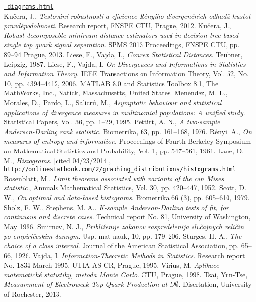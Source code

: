 \begin{thebibliography}{10}
\href{http://www-d0.fnal.gov/Run2Physics/top/top_public_web_pages/top_feynman_diagrams.html}{\texttt{\_diagrams.html}}\\
Ku\v cera, J., {\em Testov\' an\'i robustnosti a eficience R\' enyiho divergen\v cn\' ich odhad\r u hustot pravd\v epodobnosti}. Research report, FNSPE CTU, Prague, 2012.
Ku\v cera, J., {\em Robust \ren decomposable minimum distance estimators used in decision tree based single top quark  signal separation}. SPMS 2013 Proceedings, FNSPE CTU, pp. 89--94 Prague, 2013.
Liese, F., Vajda, I., {\em Convex Statistical Distances}. Teubner, Leipzig, 1987.
Liese, F., Vajda, I. {\em On Divergences and Informations in Statistics and Information Theory}. IEEE Transactions on Information Theory, Vol. 52, No. 10, pp. 4394--4412, 2006.
 MATLAB 8.0 and Statistics Toolbox 8.1, The MathWorks, Inc., Natick, Massachusetts, United States.
 Men\'endez, M. L., Morales, D., Pardo, L., Salicr\'u, M., {\em Asymptotic behaviour and statistical applications of divergence measures in multinomial populations: A unified study}. Statistical Papers, Vol. 36, pp. 1--29, 1995.
Pettitt, A. N., {\em A two-sample Anderson-Darling rank statistic}. Biometrika, 63, pp. 161--168, 1976.
 R\'enyi, A., {\em On measures of entropy and information}. Proceedings of Fourth Berkeley Symposium on Mathematical Statistics and Probability, Vol. 1, pp. 547--561, 1961.
 Lane, D. M., {\em Histograms}. [cited 04/23/2014], \\
\href{http://onlinestatbook.com/2/graphing_distributions/histograms.html}{\texttt{http://onlinestatbook.com/2/graphing\_distributions/histograms.html}}
 Rosenblatt, M., {\em Limit theorems associated with variants of the con Mises statistic}., Annuals Mathematical Statistics, Vol. 30, pp. 420--447, 1952.
 Scott, D. W., {\em On optimal and data-based histograms}. Biometrika 66 (3), pp. 605–610, 1979.
 Sholz, F. W., Stephens, M. A., {\em K-sample Anderson-Darling tests of fit, for continuous and discrete cases}. Technical report No. 81, University of Washington, May 1986.
Smirnov, N. J., {\em Pribli\v{z}enije zakonov raspredelenija slu\v{c}ajnych veli\v{c}in po empiri\v{c}eskim dannym}. Usp. mat nauk, 10, pp. 179--206.
 Sturges, H. A., {\em The choice of a class interval}. Journal of the American Statistical Association, pp. 65--66, 1926.
Vajda, I. {\em Information-Theoretic Methods in Statistics}. Research report No. 1834 March 1995, UTIA AS CR, Prague, 1995.
Virius, M. {\em Aplikace matematick\'e statistiky, metoda Monte Carlo}. CTU, Prague, 1998.
Tsai, Yun-Tse, {\em Measurement of Electroweak Top Quark Production at} $D\mathit{\emptyset}$. Disertation, University of Rochester, 2013.
\end{thebibliography}